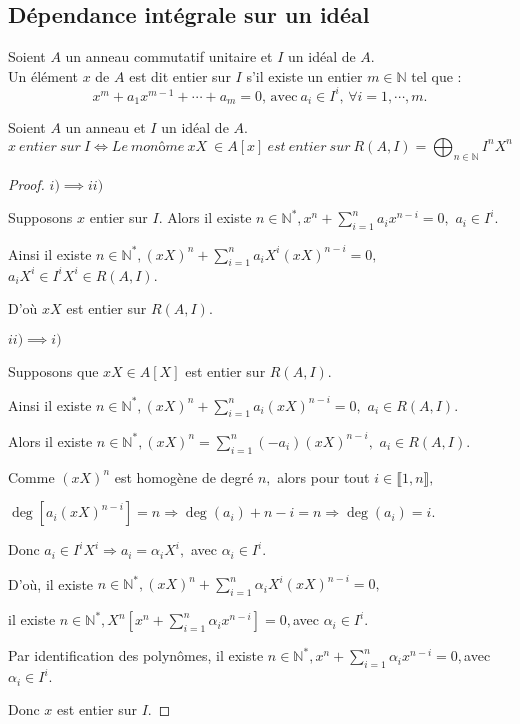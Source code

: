 \subsection{Dépendance intégrale sur un idéal}
\begin{madefinition}
	Soient $A$ un anneau commutatif unitaire et $I$ un idéal de $A$.\\ Un élément $x$ de $A$ est dit entier sur $I$ s'il existe un entier $m \in \mathbb{N}$ tel que : 
	\[ 	x^m + a_1 x^{m-1} + \cdots + a_m = 0\text{, avec} \ a_i \in I^i,\, \forall i=1, \cdots ,m. \]	
\end{madefinition}
\begin{maproposition}
	Soient $A$ un anneau et $I$ un idéal de $A$.
	\[ x \ entier \ sur \ I \Longleftrightarrow Le \ monôme \ xX \ \in A[x] \ est \ entier \ sur \ R(A, I) = \displaystyle \bigoplus_{n \in \mathbb{N}}{I^nX^n} \]
\end{maproposition}
\begin{proof}
	$i) \implies ii)$
	
	Supposons $x$ entier sur $I.$ Alors il existe $n\in \mathbb{N}^{\ast },x^{n}+\sum\limits_{i=1}^{n}a_{i}x^{n-i}=0,$ $a_{i}\in I^{i}.$
	
	Ainsi il existe $n\in \mathbb{N}^{\ast },(xX)^{n}+\sum\limits_{i=1}^{n}a_{i}X^{i}(xX)^{n-i}=0,$ $%
	a_{i}X^{i}\in I^{i}X^{i}\in R(A,I).$
	
	D’où $xX$ est entier sur $R(A,I).$
	
	$ii)\implies i)$
	
	Supposons que  $xX\in A[X]$ est entier sur $R(A,I).$
	
	Ainsi il existe $n\in \mathbb{N}^{\ast },(xX)^{n}+\sum\limits_{i=1}^{n}a_{i}(xX)^{n-i}=0,$ $a_{i}\in R(A,I).
	$
	
	Alors il existe $n\in \mathbb{N}^{\ast },(xX)^{n}=\sum\limits_{i=1}^{n}(-a_{i})(xX)^{n-i},$ $a_{i}\in
	R(A,I).$
	
	Comme $(xX)^{n}$ est homogène de degré $n,$ alors pour tout $i\in \llbracket 1, n \rrbracket,$
	
	$\deg [a_{i}(xX)^{n-i}]=n\Rightarrow \deg (a_{i})+n-i=n\Rightarrow \deg
	(a_{i})=i.$
	
	Donc $a_{i}\in I^{i}X^{i}\Rightarrow a_{i}=\alpha _{i}X^{i},$ avec $\alpha
	_{i}\in I^{i}.$
	
	D’où, il existe $n\in \mathbb{N}^{\ast },(xX)^{n}+\sum\limits_{i=1}^{n}\alpha _{i}X^{i}(xX)^{n-i}=0,$
	
	il existe $n\in \mathbb{N}^{\ast },X^{n}[x^{n}+\sum\limits_{i=1}^{n}\alpha _{i}x^{n-i}]=0,$avec $\alpha _{i}\in I^{i}.$
	
	Par identification des polynômes, il existe $n\in \mathbb{N}^{\ast },x^{n}+\sum\limits_{i=1}^{n}\alpha _{i}x^{n-i}=0,$avec $\alpha_{i}\in I^{i}.$
	
	Donc $x$ est entier sur $I.$
\end{proof}
